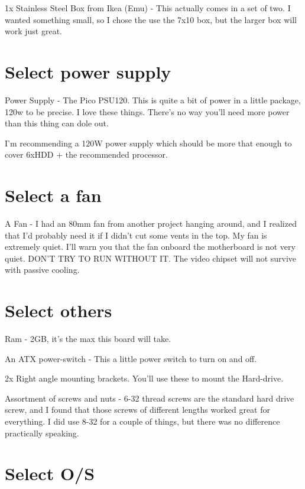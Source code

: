 1x Stainless Steel Box from Ikea (Emu) - This actually comes in a set of two. I
wanted something small, so I chose the use the 7x10 box, but the larger box will
work just great.


\section{Select power supply}


Power Supply - The Pico PSU120. This is quite a bit of power in a little
package, 120w to be precise. I love these things. There's no way you'll need
more power than this thing can dole out.

I’m recommending a 120W power supply which should be more that enough to cover
6xHDD + the recommended processor.

\section{Select a fan}

A Fan - I had an 80mm fan from another project hanging around, and I realized
that I'd probably need it if I didn't cut some vents in the top. My fan is extremely quiet. I'll warn you that the fan onboard the motherboard is not very quiet. DON'T TRY TO RUN WITHOUT IT. The video chipset will not survive with passive cooling. 

\section{Select others}

Ram - 2GB, it's the max this board will take.

An ATX power-switch - This a little power switch to turn on and off.

2x Right angle mounting brackets. You'll use these to mount the Hard-drive.

Assortment of screws and nuts - 6-32 thread screws are the standard hard drive screw, and I found that those screws of different lengths worked great for everything. I did use 8-32 for a couple of things, but there was no difference practically speaking.


\section{Select O/S}
\label{sec:O/S_for-NAS}


